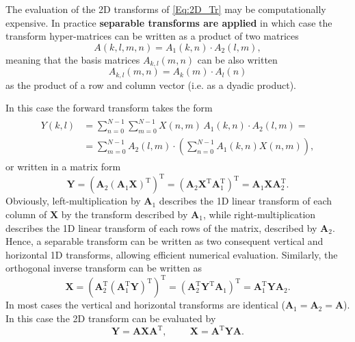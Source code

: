 \vspace{3mm}
The evaluation of the 2D transforms of \eqref{Eq:2D_Tr} may be computationally expensive.
In practice \textbf{separable transforms are applied} in which case the transform hyper-matrices can be written as a product of two matrices
\begin{equation}
A(k,l,m,n) = A_1(k,n) \cdot A_2(l,m),
\end{equation}
meaning that the basis matrices $ A_{k,l}(m,n)$ can be also written
\begin{equation}
A_{k,l}(m,n) = A_{k}(m) \cdot A_{l}(n)
\end{equation}
as the product of a row and column vector (i.e. as a dyadic product).

In this case the forward transform takes the form 
\begin{align}
\begin{split}
Y(k,l) &= \sum_{n=0}^{N-1} \sum_{m=0}^{N-1} X(n,m) \,  A_1(k,n) \cdot A_2(l,m) = \\
&= \sum_{m=0}^{N-1} A_2(l,m) \cdot \left( \sum_{n=0}^{N-1} A_1(k,n)  X(n,m) \right),
\end{split}
\end{align}
or written in a matrix form
\begin{equation}
\mathbf{Y} = \left( \mathbf{A}_2 \left( \mathbf{A}_1 \mathbf{X} \right)^{\mathrm{T}} \right)^{\mathrm{T}}= 
\left( \mathbf{A}_2 \mathbf{X}^{\mathrm{T}} \mathbf{A}_1^{\mathrm{T}} \right)^{\mathrm{T}} = 
\mathbf{A}_1 \mathbf{X} \mathbf{A}_2^{\mathrm{T}} .
\end{equation}
Obviously, left-multiplication by $\mathbf{A}_1$ describes the 1D linear transform of each column of $\mathbf{X}$ by the transform described by $\mathbf{A}_1$, while right-multiplication describes the 1D linear transform of each rows of the matrix, described by $\mathbf{A}_2$.
Hence, a separable transform can be written as two consequent vertical and horizontal 1D transforms, allowing efficient numerical evaluation.
Similarly, the orthogonal inverse transform can be written as
\begin{equation}
\mathbf{X} = \left( \mathbf{A}_2^{\mathrm{T}} \left( \mathbf{A}_1^{\mathrm{T}} \mathbf{Y} \right)^{\mathrm{T}} \right)^{\mathrm{T}}= 
\left( \mathbf{A}_2^{\mathrm{T}} \mathbf{Y}^{\mathrm{T}} \mathbf{A}_1 \right)^{\mathrm{T}} = 
\mathbf{A}_1^{\mathrm{T}} \mathbf{Y} \mathbf{A}_2.
\end{equation}
In most cases the vertical and horizontal transforms are identical ($\mathbf{A}_1 = \mathbf{A}_2 = \mathbf{A}$).
In this case the 2D transform can be evaluated by 
\begin{equation}
\mathbf{Y} = \mathbf{A} \mathbf{X} \mathbf{A}^{\mathrm{T}}, \hspace{1cm} 
\mathbf{X} = \mathbf{A}^{\mathrm{T}} \mathbf{Y} \mathbf{A}.
\end{equation}

